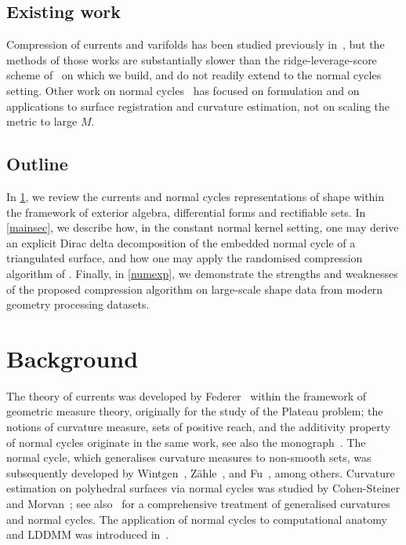 \documentclass[sn-mathphys-num]{sn-jnl}%
\theoremstyle{thmstyleone}%
\theoremstyle{thmstyletwo}%
\theoremstyle{thmstylethree}%
\numberwithin{remark}{section}
\numberwithin{definition}{section}
\numberwithin{equation}{section}
\numberwithin{theorem}{section}
\begin{document}
\subsection{Existing work}
Compression of currents and varifolds has been studied previously in~\cite{DURRLEMAN,VarCompression}, but the methods of those works are substantially slower than the ridge-leverage-score scheme of~\cite{SparseNystromCurrVar} on which we build, and do not readily extend to the normal cycles setting. Other work on normal cycles~\cite{NCThesis,NCpaper,CohenSteiner2003} has focused on formulation and on applications to surface registration and curvature estimation, not on scaling the metric to large $M$.

\subsection{Outline}
In \cref{bg}, we review the currents and normal cycles representations of shape within the framework of exterior algebra, differential forms and rectifiable sets. In \cref{mainsec}, we describe how, in the constant normal kernel setting, one may derive an explicit Dirac delta decomposition of the embedded normal cycle of a triangulated surface, and how one may apply the randomised compression algorithm of \cite{SparseNystromCurrVar}. Finally, in \cref{numexp}, we demonstrate the strengths and weaknesses of the proposed compression algorithm on large-scale shape data from modern geometry processing datasets. 


\section{Background}\label{bg}
The theory of currents was developed by Federer~\cite{Federer1959}
within the framework of geometric measure theory, originally for the
study of the Plateau problem; the notions of curvature measure,
sets of positive reach, and the additivity property of normal
cycles originate in the same work, see also the
monograph~\cite{Federer}. The normal cycle, which generalises 
curvature measures to non-smooth sets, was subsequently developed 
by Wintgen~\cite{wintgen1982normal}, 
Z\"ahle~\cite{zahle1986integral}, and 
Fu~\cite{fu1989monge}, among others. Curvature estimation on 
polyhedral surfaces via normal cycles was studied by Cohen-Steiner 
and Morvan~\cite{CohenSteiner2003}; see 
also~\cite{Morvan2008} for a comprehensive treatment of 
generalised curvatures and normal cycles. The application of normal 
cycles to computational anatomy and LDDMM was introduced 
in~\cite{NCThesis,NCpaper}.
\end{document}
